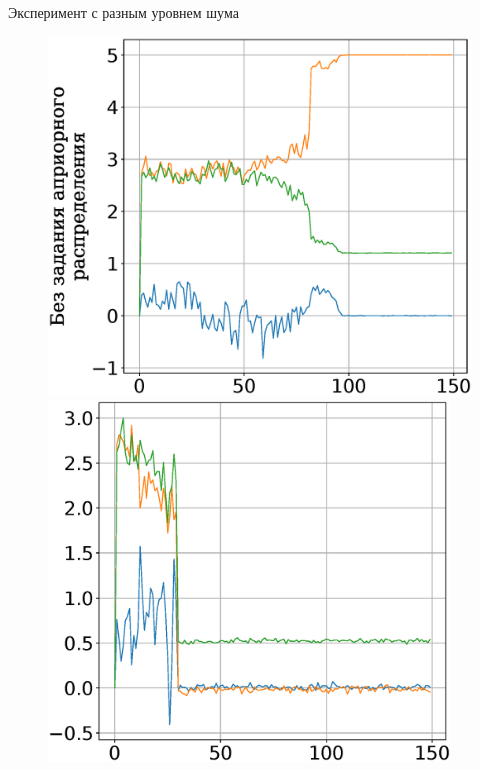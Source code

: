 \documentclass[10pt,pdf,hyperref={unicode}]{beamer}
\begin{document}
\begin{frame}{Эксперимент с разным уровнем шума}
\begin{figure}[h]
\begin{minipage}{.27\textwidth}
      \includegraphics[width = 1.0\textwidth]{figures/900noise.eps}
\end{minipage}
\begin{minipage}{.27\textwidth}
\hspace{-0.4mm}
      \includegraphics[width = 0.95\textwidth]{figures/901noise.eps}
\end{minipage}
\begin{minipage}{.27\textwidth}

\end{minipage}
\end{figure}
\end{frame}
\end{document}
